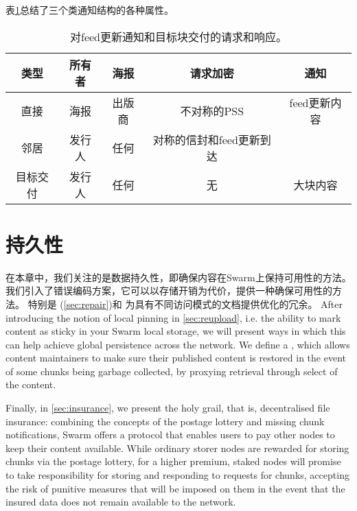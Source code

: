 表\ref{tab:notifications}总结了三个类通知结构的各种属性。

\begin{table}[htpb]
    \centering
    \begin{tabular}{c c c c c | | | | |}
    类型&所有者&海报&请求加密&通知\\\hline
直接&海报&出版商&不对称的PSS & feed更新内容\\
邻居&发行人&任何&对称的信封和feed更新到达\\
目标交付&发行人&任何&无&大块内容\\
    \end{tabular}
    \caption[提要更新通知]{对feed更新通知和目标块交付的请求和响应。}
    \label{tab:notifications}
\end{table}

\chapter{持久性\statusgreen}\label{sec:persistence}


在本章中，我们关注的是数据持久性，即确保内容在Swarm上保持可用性的方法。
我们引入了错误编码方案，它可以以存储开销为代价，提供一种确保可用性的方法。
特别是 (\ref{sec:repair})和 %
为具有不同访问模式的文档提供优化的冗余。
After introducing the notion of local pinning in \ref{sec:reupload}, i.e. the ability to mark content as sticky in your Swarm local storage, we will present ways in which this can help achieve global persistence across the network. We define a , which allows content maintainers to make sure their published content is restored in the event of some chunks being garbage collected, by proxying retrieval through select  of the content.

Finally, in \ref{sec:insurance}, we present the holy grail, that is, decentralised file insurance: combining the concepts of the postage lottery and missing chunk notifications, Swarm offers a protocol that enables users to pay other nodes to keep their content available. While ordinary storer nodes are rewarded for storing chunks via the postage lottery, for a higher premium, staked nodes will promise to take responsibility for storing and responding to requests for chunks, accepting the risk of punitive measures that will be imposed on them in the event that the insured data does not remain available to the network.


